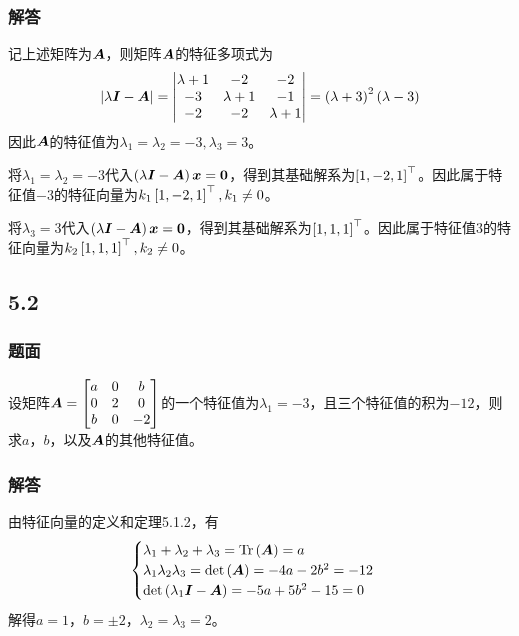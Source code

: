 \documentclass[9pt,xcolor=svgnames]{beamer} %
\begin{document}
\begin{frame}
    \frametitle{解答}
    记上述矩阵为\(\boldsymbol{A}\)，则矩阵\(\boldsymbol{A}\)的特征多项式为
    \begin{equation*}
        \left|\lambda\boldsymbol{I}-\boldsymbol{A} \right| =
        \begin{vmatrix}
            \lambda+1 & -2        & -2        \\
            -3        & \lambda+1 & -1        \\
            -2        & -2        & \lambda+1
        \end{vmatrix}=\left( \lambda+3 \right)^2\left( \lambda-3 \right)
    \end{equation*}
    因此\(\boldsymbol{A}\)的特征值为\(\lambda_1=\lambda_2=-3,\lambda_3=3\)。
    \pause

    将\(\lambda_1=\lambda_2=-3\)代入\(\left( \lambda\boldsymbol{I}-\boldsymbol{A} \right)\boldsymbol{x}=\boldsymbol{0}\)，得到其基础解系为\(\left[ 1,-2,1 \right]^\top\)。因此属于特征值\(-3\)的特征向量为\(k_1\left[ 1,-2,1 \right]^\top,k_1\neq0\)。

    将\(\lambda_3=3\)代入\(\left( \lambda\boldsymbol{I}-\boldsymbol{A} \right)\boldsymbol{x}=\boldsymbol{0}\)，得到其基础解系为\(\left[ 1,1,1 \right]^\top\)。因此属于特征值\(3\)的特征向量为\(k_2\left[ 1,1,1 \right]^\top,k_2\neq0\)。
\end{frame}

\subsection*{5.2}
\begin{frame}
    \frametitle{题面}
    设矩阵\(\boldsymbol{A}=\begin{bmatrix}a&0&b\\0&2&0\\b&0&-2\end{bmatrix}\)的一个特征值为\(\lambda_1=-3\)，且三个特征值的积为\(-12\)，则求\(a\)，\(b\)，以及\(\boldsymbol{A}\)的其他特征值。
\end{frame}

\begin{frame}
    \frametitle{解答}
    由特征向量的定义和定理5.1.2，有
    \begin{equation*}
        \begin{cases}
            \lambda_1+\lambda_2+\lambda_3=\mathrm{Tr}\left( \boldsymbol{A} \right)=a        \\
            \lambda_1\lambda_2\lambda_3=\mathrm{det}\left( \boldsymbol{A} \right)=-4a-2b^2=-12 \\
            \mathrm{det}\left( \lambda_1\boldsymbol{I}-\boldsymbol{A} \right)=-5a+5b^2-15=0
        \end{cases}
    \end{equation*}
    \pause
    解得\(a=1\)，\(b=\pm2\)，\(\lambda_2=\lambda_3=2\)。
\end{frame}
\end{document}
